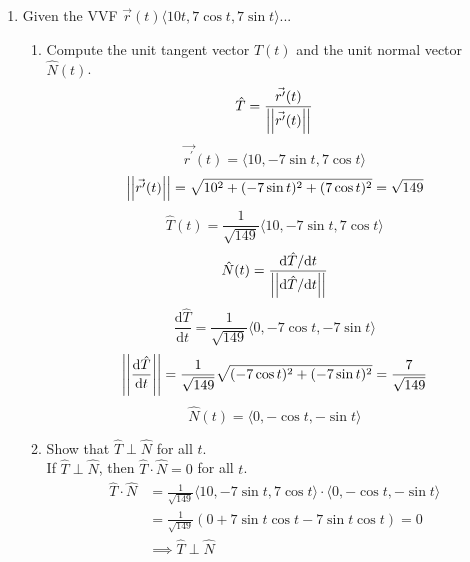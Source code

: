 \begin{enumerate}
	\item Given the VVF $\vec{r}(t)\langle 10t, 7\cos{t}, 7\sin{t} \rangle$...
	\begin{enumerate}[label=\alph*.]
		\item Compute the unit tangent vector $\hat{T}(t)$ and the unit normal vector $\hat{N}(t)$.
		\begin{equation*}
			\hat{T} = \frac{\vec{r^\prime}(t)}{\left|\left|\vec{r^\prime}(t)\right|\right|}	
		\end{equation*}
		\begin{equation*}
			\vec{r^\prime}(t) = \langle 10, -7\sin{t}, 7\cos{t} \rangle	
		\end{equation*}
		\begin{equation*}
			\left|\left|\vec{r^\prime}(t)\right|\right| = \sqrt{10^2 + (-7\sin{t})^2 + (7\cos{t})^2} = \sqrt{149}	
		\end{equation*}
		\begin{equation*}
			\hat{T}(t) = \frac{1}{\sqrt{149}}\langle 10, -7\sin{t}, 7\cos{t} \rangle	
		\end{equation*}
		\begin{equation*}
			\hat{N}(t) = \frac{\mathrm{d}\hat{T}/\mathrm{d}t}{\left|\left|\mathrm{d}\hat{T}/\mathrm{d}t\right|\right|}	
		\end{equation*}
		\begin{equation*}
			\frac{\mathrm{d}\hat{T}}{\mathrm{d}t} = \frac{1}{\sqrt{149}} \langle 0, -7\cos{t}, -7\sin{t} \rangle	
		\end{equation*}
		\begin{equation*}
			\left|\left|\frac{\mathrm{d}\hat{T}}{\mathrm{d}t}\right|\right| = \frac{1}{\sqrt{149}}\sqrt{(-7\cos{t})^2 + (-7\sin{t})^2} = \frac{7}{\sqrt{149}}
		\end{equation*}
		\begin{equation*}
			\hat{N}(t) = \langle 0, -\cos{t},-\sin{t}\rangle
		\end{equation*}
		
		\item Show that $\hat{T}\perp\hat{N}$ for all $t$.\\
		If $\hat{T}\perp\hat{N}$, then $\hat{T}\cdot\hat{N} = 0$ for all $t$.\\
		\begin{align*}
			\hat{T} \cdot \hat{N} &= \frac{1}{\sqrt{149}}\langle 10, -7\sin{t}, 7\cos{t} \rangle \cdot \langle 0, -\cos{t}, -\sin{t}\rangle	\\
			&= \frac{1}{\sqrt{149}}(0 + 7\sin{t}\cos{t} - 7\sin{t}\cos{t}) = 0 \\
			&\implies \hat{T}\perp\hat{N}
		\end{align*}
	\end{enumerate}
	

\end{enumerate}

